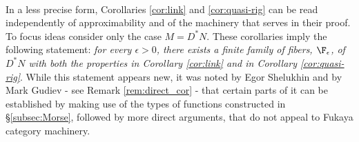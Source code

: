 \


In a less precise form,  Corollaries  \ref{cor:link} and \ref{cor:quasi-rig} can be read independently of approximability and of the machinery that serves in their proof. To focus ideas consider only the case $M=D^{\ast}N$. These corollaries imply the following statement: {\em for  every $\epsilon >0$, there exists a  finite family   of fibers, $\F_{\epsilon}$, of $D^{\ast}N$ with both the properties in Corollary \ref{cor:link} and in Corollary \ref{cor:quasi-rig}}.  While this statement appears new, it was noted by Egor Shelukhin and  by Mark Gudiev - see Remark \ref{rem:direct_cor} - that certain parts of it can be established by making use of the types of functions constructed in \S\ref{subsec:Morse}, followed by more direct arguments, that do not appeal to Fukaya category machinery. 

\

